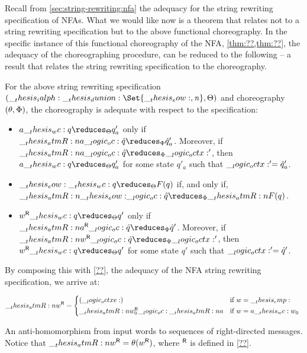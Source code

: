 Recall from \cref{sec:string-rewriting:nfa} the adequacy  for the string rewriting specification of \acp{NFA}.
%
\nfaadequacystringrewriting*
%
What we would like now is a theorem that relates  not to a string rewriting specification but to the above functional choreography.
In the specific instance of this functional choreography of the \ac{NFA}, \cref{thm:??,thm:??}, the adequacy of the choreographing procedure, can be reduced to the following  -- a result that relates the string rewriting specification to the choreography.
\begin{corollary}\label{cor:chor-nfa-adequacy}
  For the above string rewriting specification $(\ialph \dunion \Set{\eow, \symrej}, \srsig)$ and choreography $(\theta, \Phi)$, the choreography is adequate with respect to the specification:
  \begin{itemize}[nosep]
  \item
    $a \wc q \reduces_{\srsig} q'_a$ only if $\atmR{a} \oc \defp{q} \reduces_{\orsig} \defp{q}'_a$.
    Moreover, if $\atmR{a} \oc \defp{q} \reduces_{\orsig} \octx'$, then $a \wc q \reduces_{\srsig} q'_a$ for some state $q'_a$ such that $\__logic_octx:' = \hat{q}'_a$.
  \item
    $\eow \wc q \reduces_{\srsig} F(q)$ if, and only if, $\atmR{\eow} \oc \defp{q} \reduces_{\orsig} \atmR{F}(q)$.
  \item
    $\rev{w} \wc q \reduces_{\srsig} q'$ only if $\rev{\atmR{a}} \oc \defp{q} \reduces_{\orsig} \defp{q}'$.
    Moreover, if $\rev{\atmR{w}} \oc \defp{q} \reduces_{\orsig} \octx'$, then $\rev{w} \wc q \reduces_{\srsig} q'$ for some state $q'$ such that $\__logic_octx:' = \hat{q}'$.
  \end{itemize}
\end{corollary}
%
\noindent By composing this with \cref{??}, the adequacy of the \ac{NFA} string rewriting specification, we arrive at:
%
\begin{marginfigure}
  \begin{equation*}
    \rev{\atmR{w}} =
      \begin{cases*}
        (\octxe) & if $w = \emp$ \\
        \rev{\atmR{w}_0} \oc \atmR{a} & if $w = a \wc w_0$
      \end{cases*}
  \end{equation*}
  \caption{An anti-homomorphism from input words to sequences of right-directed messages.
    Notice that $\rev{\atmR{w}} = \theta(\rev{w})$, where $\rev{}$ is defined in \cref{??}.}\label{fig:formula-as-process:msg-rev}
\end{marginfigure}%

